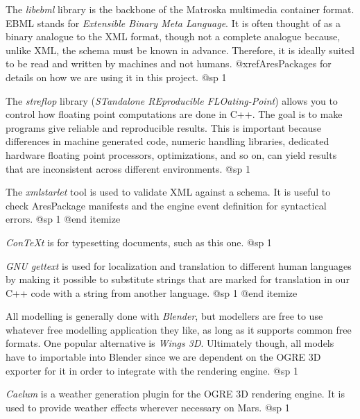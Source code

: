 \item
The {\it libebml} library is the backbone of the Matroska multimedia container format. EBML stands for {\it Extensible Binary Meta Language}. It is often thought of as a binary analogue to the XML format, though not a complete analogue because, unlike XML, the schema must be known in advance. Therefore, it is ideally suited to be read and written by machines and not humans. @xref{AresPackages} for details on how we are using it in this project.
@sp 1

\item
The {\it streflop} library ({\it STandalone REproducible FLOating-Point}) allows you to control how floating point computations are done in C++. The goal is to make programs give reliable and reproducible results. This is important because differences in machine generated code, numeric handling libraries, dedicated hardware floating point processors, optimizations, and so on, can yield results that are inconsistent across different environments.
@sp 1

\item
The {\it xmlstarlet} tool is used to validate XML against a schema. It is useful to check AresPackage manifests and the engine event definition for syntactical errors.
@sp 1
@end itemize



\itemize
\item
{\it ConTeXt} is for typesetting documents, such as this one.
@sp 1

\item
{\it GNU gettext} is used for localization and translation to different human languages by making it possible to substitute strings that are marked for translation in our C++ code with a string from another language.
@sp 1
@end itemize


\itemize
\item
All modelling is generally done with {\it Blender}, but modellers are free to use whatever free modelling application they like, as long as it supports common free formats. One popular alternative is {\it Wings 3D}. Ultimately though, all models have to importable into Blender since we are dependent on the OGRE 3D exporter for it in order to integrate with the rendering engine.
@sp 1

\item
{\it Caelum} is a weather generation plugin for the OGRE 3D rendering engine. It is used to provide weather effects wherever necessary on Mars.
@sp 1

